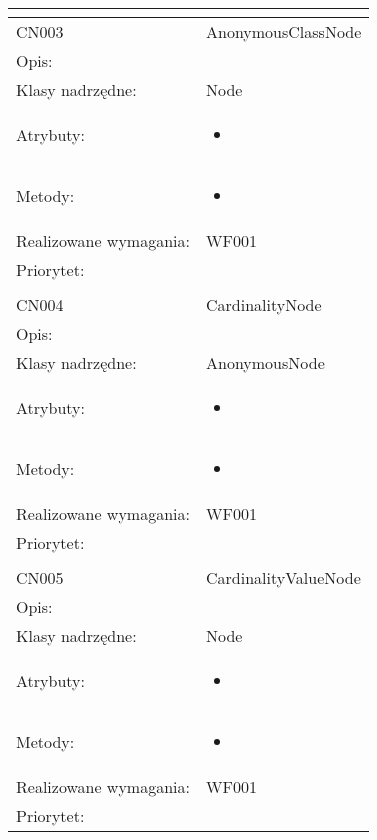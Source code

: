 \documentclass[a4paper,10pt]{article}
\begin{document}
\begin{center}
\begin{tabular}{|m{3cm}|m{9cm}|}
\multicolumn{2}{c}{} \\
 \hline

CN003 & AnonymousClassNode \\ \hline
Opis: &     \\ \hline
Klasy nadrzędne: & Node     \\ \hline
Atrybuty: & \begin{itemize}
 \item 
\end{itemize}
 \\ \hline
Metody: & \begin{itemize}
 \item 
\end{itemize}
  \\ \hline
Realizowane wymagania: & WF001 \\ \hline
Priorytet: &  \\ \hline

\multicolumn{2}{c}{} \\
 \hline

CN004 & CardinalityNode \\ \hline
Opis: &     \\ \hline
Klasy nadrzędne: & AnonymousNode     \\ \hline
Atrybuty: & \begin{itemize}
 \item 
\end{itemize}
 \\ \hline
Metody: & \begin{itemize}
 \item 
\end{itemize}
  \\ \hline
Realizowane wymagania: & WF001 \\ \hline
Priorytet: &  \\ \hline

\multicolumn{2}{c}{} \\
 \hline

CN005 & CardinalityValueNode \\ \hline
Opis: &     \\ \hline
Klasy nadrzędne: & Node     \\ \hline
Atrybuty: & \begin{itemize}
 \item 
\end{itemize}
 \\ \hline
Metody: & \begin{itemize}
 \item 
\end{itemize}
  \\ \hline
Realizowane wymagania: & WF001 \\ \hline
Priorytet: &  \\ \hline


\end{tabular}
\end{center}
\end{document}
